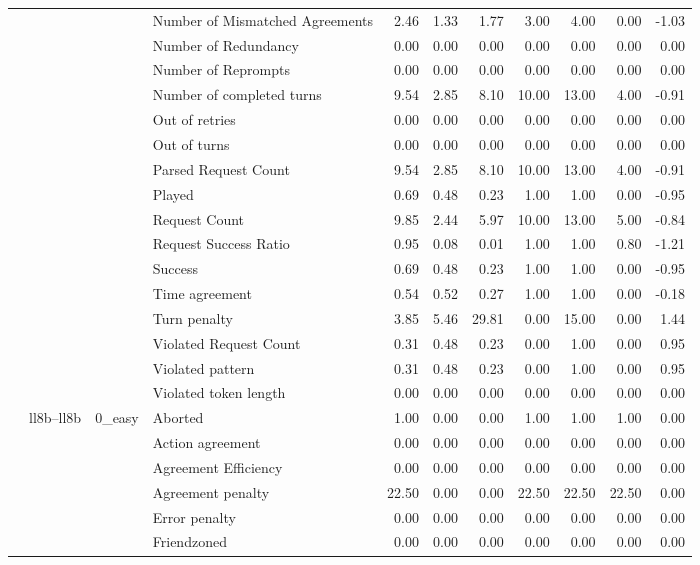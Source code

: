 \begin{tabular}{llllrrrrrrr}
 &  &  & Number of Mismatched Agreements & 2.46 & 1.33 & 1.77 & 3.00 & 4.00 & 0.00 & -1.03 \\
 &  &  & Number of Redundancy & 0.00 & 0.00 & 0.00 & 0.00 & 0.00 & 0.00 & 0.00 \\
 &  &  & Number of Reprompts & 0.00 & 0.00 & 0.00 & 0.00 & 0.00 & 0.00 & 0.00 \\
 &  &  & Number of completed turns & 9.54 & 2.85 & 8.10 & 10.00 & 13.00 & 4.00 & -0.91 \\
 &  &  & Out of retries & 0.00 & 0.00 & 0.00 & 0.00 & 0.00 & 0.00 & 0.00 \\
 &  &  & Out of turns & 0.00 & 0.00 & 0.00 & 0.00 & 0.00 & 0.00 & 0.00 \\
 &  &  & Parsed Request Count & 9.54 & 2.85 & 8.10 & 10.00 & 13.00 & 4.00 & -0.91 \\
 &  &  & Played & 0.69 & 0.48 & 0.23 & 1.00 & 1.00 & 0.00 & -0.95 \\
 &  &  & Request Count & 9.85 & 2.44 & 5.97 & 10.00 & 13.00 & 5.00 & -0.84 \\
 &  &  & Request Success Ratio & 0.95 & 0.08 & 0.01 & 1.00 & 1.00 & 0.80 & -1.21 \\
 &  &  & Success & 0.69 & 0.48 & 0.23 & 1.00 & 1.00 & 0.00 & -0.95 \\
 &  &  & Time agreement & 0.54 & 0.52 & 0.27 & 1.00 & 1.00 & 0.00 & -0.18 \\
 &  &  & Turn penalty & 3.85 & 5.46 & 29.81 & 0.00 & 15.00 & 0.00 & 1.44 \\
 &  &  & Violated Request Count & 0.31 & 0.48 & 0.23 & 0.00 & 1.00 & 0.00 & 0.95 \\
 &  &  & Violated pattern & 0.31 & 0.48 & 0.23 & 0.00 & 1.00 & 0.00 & 0.95 \\
 &  &  & Violated token length & 0.00 & 0.00 & 0.00 & 0.00 & 0.00 & 0.00 & 0.00 \\
\cline{2-11} \cline{3-11}
 & \multirow[t]{216}{*}{ll8b--ll8b} & \multirow[t]{27}{*}{0_easy} & Aborted & 1.00 & 0.00 & 0.00 & 1.00 & 1.00 & 1.00 & 0.00 \\
 &  &  & Action agreement & 0.00 & 0.00 & 0.00 & 0.00 & 0.00 & 0.00 & 0.00 \\
 &  &  & Agreement Efficiency & 0.00 & 0.00 & 0.00 & 0.00 & 0.00 & 0.00 & 0.00 \\
 &  &  & Agreement penalty & 22.50 & 0.00 & 0.00 & 22.50 & 22.50 & 22.50 & 0.00 \\
 &  &  & Error penalty & 0.00 & 0.00 & 0.00 & 0.00 & 0.00 & 0.00 & 0.00 \\
 &  &  & Friendzoned & 0.00 & 0.00 & 0.00 & 0.00 & 0.00 & 0.00 & 0.00 \\

\end{tabular}
